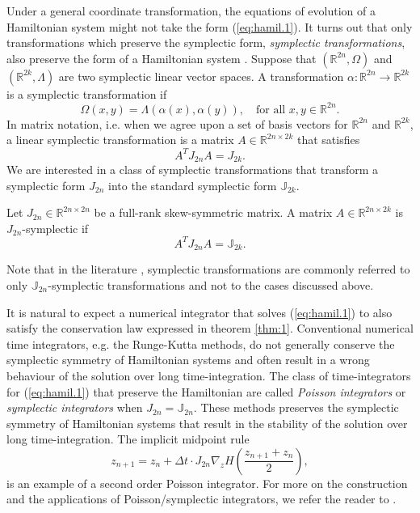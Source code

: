 Under a general coordinate transformation, the equations of evolution of a Hamiltonian system might not take the form (\ref{eq:hamil.1}). It turns out that only transformations which preserve the symplectic form, \emph{symplectic transformations}, also preserve the form of a Hamiltonian system \cite{Hairer:1250576}. Suppose that $(\mathbb R^{2n},\Omega)$ and $(\mathbb R^{2k},\Lambda)$ are two symplectic linear vector spaces. A transformation $\alpha:\mathbb R^{2n}\to\mathbb R^{2k}$ is a symplectic transformation if
\begin{equation}
	\Omega(x,y) = \Lambda(\alpha(x),\alpha(y)), \quad \text{for all } x,y\in\mathbb R^{2n}.
\end{equation}
In matrix notation, i.e. when we agree upon a set of basis vectors for $\mathbb R^{2n}$ and $\mathbb R^{2k}$, a linear symplectic transformation is a matrix $A\in \mathbb R^{2n\times 2k}$ that satisfies
\begin{equation}
	A^T J_{2n} A = J_{2k}.
\end{equation}
We are interested in a class of symplectic transformations that transform a symplectic form $J_{2n}$ into the standard symplectic form $\mathbb J_{2k}$.
\begin{definition}
Let $J_{2n}\in \mathbb R^{2n\times 2n}$ be a full-rank skew-symmetric matrix. A matrix $A\in\mathbb R^{2n\times 2k}$ is $J_{2n}$-symplectic if
\begin{equation}
A^T J_{2n} A = \mathbb{J}_{2k}.
\end{equation}
\end{definition}
Note that in the literature \cite{Marsden:2010:IMS:1965128,Hairer:1250576}, symplectic transformations are commonly referred to only $\mathbb J_{2n}$-symplectic transformations and not to the cases discussed above.

It is natural to expect a numerical integrator that solves (\ref{eq:hamil.1}) to also satisfy the conservation law expressed in theorem \ref{thm:1}. Conventional numerical time integrators, e.g. the Runge-Kutta methods, do not generally conserve the symplectic symmetry of Hamiltonian systems and often result in a wrong behaviour of the solution over long time-integration. The class of time-integrators for (\ref{eq:hamil.1}) that preserve the Hamiltonian are called \emph{Poisson integrators} or \emph{symplectic integrators} when $J_{2n} = \mathbb J_{2n}$. These methods preserves the symplectic symmetry of Hamiltonian systems that result in the stability of the solution over long time-integration. The implicit midpoint rule
\begin{equation}
	z_{n+1} = z_{n} + \Delta t \cdot J_{2n} \nabla_z H( \frac{z_{n+1} + z_n}{2} ),
\end{equation}
is an example of a second order Poisson integrator. For more on the construction and the applications of Poisson/symplectic integrators, we refer the reader to \cite{Hairer:1250576}. 
